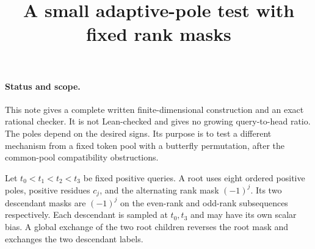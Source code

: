 \documentclass[11pt]{article}
\title{A small adaptive-pole test with fixed rank masks}
\author{}\date{}
\begin{document}
\maketitle
\paragraph{Status and scope.}
This note gives a complete written finite-dimensional construction and an
exact rational checker. It is not Lean-checked and gives no growing
query-to-head ratio. The poles depend on the desired signs. Its purpose
is to test a different mechanism from a fixed token pool with a
butterfly permutation, after the common-pool compatibility obstructions.

Let $t_0<t_1<t_2<t_3$ be fixed positive queries. A root uses eight
ordered positive poles, positive residues $c_j$, and the alternating
rank mask $(-1)^j$. Its two descendant masks are $(-1)^j$ on the
even-rank and odd-rank subsequences respectively. Each descendant is
sampled at $t_0,t_3$ and may have its own scalar bias.
A global exchange of the two root children reverses the root mask and
exchanges the two descendant labels.
\end{document}
